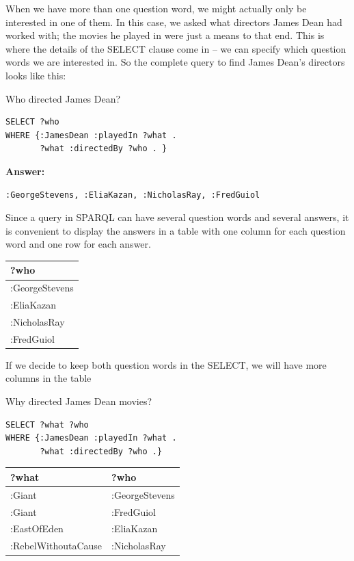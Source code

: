 When we have more than one question word, we might actually only be
interested in one of them. In this case, we asked what directors James
Dean had worked with; the movies he played in were just a means to that
end. This is where the details of the SELECT clause come in -- we can
specify which question words we are interested in. So the complete query
to find James Dean's directors looks like this:

\begin{query}Who directed James Dean?\end{query}

\begin{lstlisting}
SELECT ?who
WHERE {:JamesDean :playedIn ?what .
       ?what :directedBy ?who . }
\end{lstlisting}

\textbf{\textbf{Answer:}}

\begin{lstlisting}
:GeorgeStevens, :EliaKazan, :NicholasRay, :FredGuiol
\end{lstlisting}

Since a query in SPARQL can have several question words and several
answers, it is convenient to display the answers in a table with one
column for each question word and one row for each answer.

\begin{tabular}{|l|}
\hline
?who\\
\hline
:GeorgeStevens\\
:EliaKazan\\
:NicholasRay\\
:FredGuiol\\
\hline
\end{tabular}

If we decide to keep both question words in the SELECT, we will have
more columns in the table

\begin{query}Why directed James Dean movies?\end{query}

\begin{lstlisting}
SELECT ?what ?who
WHERE {:JamesDean :playedIn ?what .
       ?what :directedBy ?who .}
\end{lstlisting}

\begin{tabular}{| l l | }
\hline
?what&?who\\
\hline
:Giant&:GeorgeStevens\\
:Giant&:FredGuiol\\
:EastOfEden&:EliaKazan\\
:RebelWithoutaCause&:NicholasRay\\
\hline
\end{tabular}

